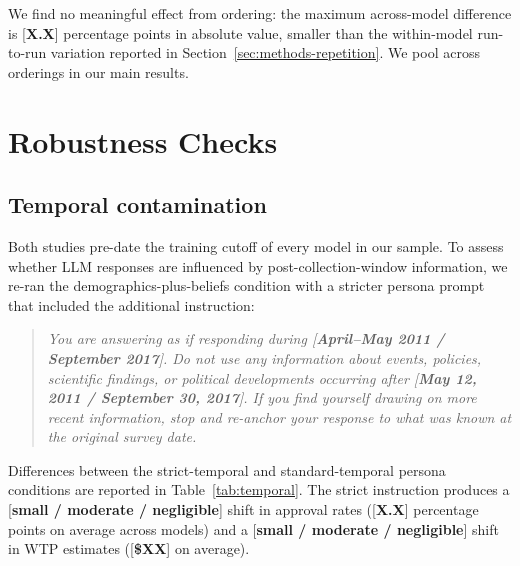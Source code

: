 \documentclass[12pt]{article}
\begin{document}
We find no meaningful effect from ordering: the maximum across-model difference is [\textbf{X.X}] percentage points in absolute value, smaller than the within-model run-to-run variation reported in Section~\ref{sec:methods-repetition}. We pool across orderings in our main results.

\section{Robustness Checks}\label{app:robustness}

\subsection{Temporal contamination}

Both studies pre-date the training cutoff of every model in our sample. To assess whether LLM responses are influenced by post-collection-window information, we re-ran the demographics-plus-beliefs condition with a stricter persona prompt that included the additional instruction:

\begin{quote}\itshape
\footnotesize
You are answering as if responding during [\textbf{April--May 2011 / September 2017}]. Do not use any information about events, policies, scientific findings, or political developments occurring after [\textbf{May 12, 2011 / September 30, 2017}]. If you find yourself drawing on more recent information, stop and re-anchor your response to what was known at the original survey date.
\end{quote}

Differences between the strict-temporal and standard-temporal persona conditions are reported in Table~\ref{tab:temporal}. The strict instruction produces a [\textbf{small / moderate / negligible}] shift in approval rates ([\textbf{X.X}] percentage points on average across models) and a [\textbf{small / moderate / negligible}] shift in WTP estimates ([\textbf{\$XX}] on average).
\end{document}
